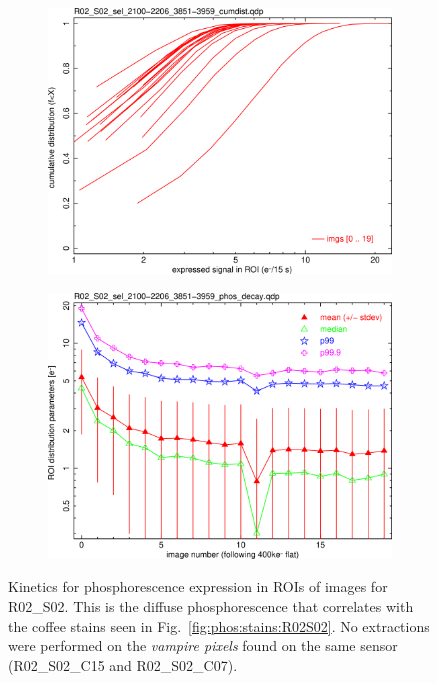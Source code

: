\begin{figure}[!htbp]
\begin{subfigure}{0.45\textwidth}
  \includegraphics[width=\textwidth]{figures/phosphorescence-survey/phos_kinetics/R02_S02_sel_2100-2206_3851-3959_cumdist.png}    
\end{subfigure}
\hfil
\begin{subfigure}{0.45\textwidth}
  \centering
  \includegraphics[width=\textwidth]{figures/phosphorescence-survey/phos_kinetics/R02_S02_sel_2100-2206_3851-3959_phos_decay.png}
\end{subfigure}
\newline
\caption{Kinetics for phosphorescence expression in ROIs of images for R02\_S02. This is the diffuse phosphorescence that correlates with the coffee stains seen in Fig.~\ref{fig:phos:stains:R02S02}. No extractions were performed on the {\it vampire pixels} found on the same sensor (R02\_S02\_C15 and R02\_S02\_C07).}
\label{fig:phos:kinetics:R02S02}
\end{figure}

